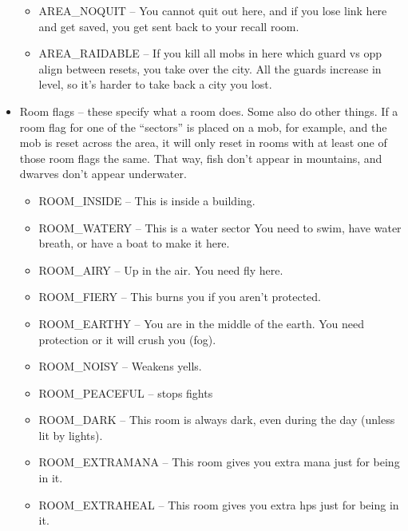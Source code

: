 \begin{itemize}
\begin{itemize}
\item AREA\_NOQUIT -- You cannot quit out here, and if you lose link here and get saved, you get sent back to your recall room.

\item AREA\_RAIDABLE -- If you kill all mobs in here which guard vs opp align between resets, you take over the city. All the guards increase in level, so it's harder to take back a city you lost.

\end{itemize}


\item Room flags -- these specify what a room does. Some also do other things. If a room flag for one of the ``sectors'' is placed on a mob, for example, and the mob is reset across the area, it will only reset in rooms with at least one of those room flags the same. That way, fish don't appear in mountains, and dwarves don't appear underwater.


\begin{itemize}

\item ROOM\_INSIDE -- This is inside a building.

\item ROOM\_WATERY -- This is a water sector You need to swim, have water breath, or have a boat to make it here.

\item ROOM\_AIRY -- Up in the air. You need fly here.

\item ROOM\_FIERY -- This burns you if you aren't protected.

\item ROOM\_EARTHY -- You are in the middle of the earth. You need protection or it will crush you (fog).

\item ROOM\_NOISY -- Weakens yells.

\item ROOM\_PEACEFUL -- stops fights

\item ROOM\_DARK -- This room is always dark, even during the day (unless lit by lights).

\item ROOM\_EXTRAMANA -- This room gives you extra mana just for being in it.

\item ROOM\_EXTRAHEAL -- This room gives you extra hps just for being in it.


\end{itemize}
\end{itemize}
